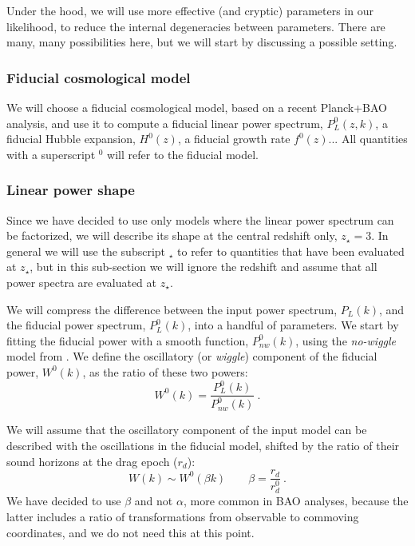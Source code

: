Under the hood, we will use more effective (and cryptic) parameters in our 
likelihood, to reduce the internal degeneracies between parameters.
There are many, many possibilities here, but we will start by discussing a 
possible setting. 

\subsubsection{Fiducial cosmological model}
 
We will choose a fiducial cosmological model, based on a recent Planck+BAO 
analysis, and use it to compute a fiducial linear power spectrum, $P_L^0(z,k)$, 
a fiducial Hubble expansion, $H^0(z)$, a fiducial growth rate $f^0(z)$...
All quantities with a superscript $^0$ will refer to the fiducial model.

\subsubsection{Linear power shape}

Since we have decided to use only models where the linear power spectrum 
can be factorized, we will describe its shape at the central redshift only, 
$z_\star=3$. 
In general we will use the subscript $_\star$ to refer to quantities that 
have been evaluated at $z_\star$, but in this sub-section we will ignore 
the redshift and assume that all power spectra are evaluated at $z_\star$.

We will compress the difference between the input power spectrum, $P_L(k)$, 
and the fiducial power spectrum, $P^0_L(k)$, into a handful of parameters. 
We start by fitting the fiducial power with a smooth function, 
$P^0_{nw}(k)$, using the \textit{no-wiggle} model from \cite{Eisenstein1998}.
We define the oscillatory (or \textit{wiggle}) component of the 
fiducial power, $W^0(k)$, as the ratio of these two powers:
\begin{equation}
 W^0(k) = \frac{P^0_L(k)}{P^0_{nw}(k)} ~.
\end{equation} 

We will assume that the oscillatory component of the input model can be 
described with the oscillations in the fiducial model, shifted by the ratio 
of their sound horizons at the drag epoch ($r_d$):
\begin{equation}
 W(k) \sim W^0(\beta k)  
\qquad  
 \beta = \frac{r_d}{r^0_d} ~.
\end{equation}
We have decided to use $\beta$ and not $\alpha$, more common in BAO analyses,
because the latter includes a ratio of transformations from observable to 
commoving coordinates, and we do not need this at this point. 

